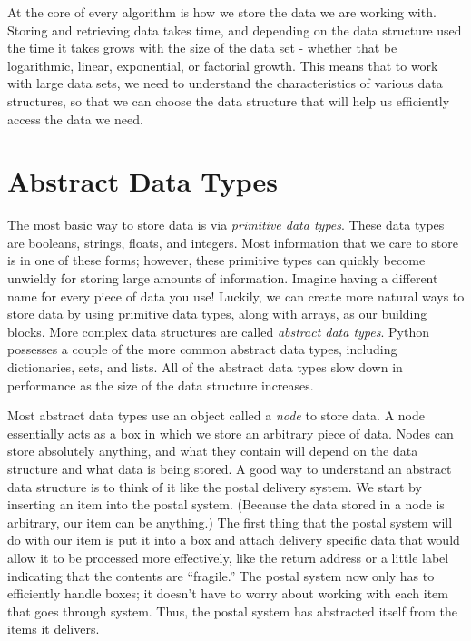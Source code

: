 \label{lab:Python_DataStructures}

At the core of every algorithm is how we store the data we are working with.
Storing and retrieving data takes time, and depending on the data structure used the time it takes grows with the size of the data set - whether that be logarithmic, linear, exponential, or factorial growth.
This means that to work with large data sets, we need to understand the characteristics of various data structures, so that we can choose the data structure that will help us efficiently access the data we need.

\section*{Abstract Data Types}

The most basic way to store data is via \emph{primitive data types}.
These data types are booleans, strings, floats, and integers.
Most information that we care to store is in one of these forms;
however, these primitive types can quickly become unwieldy for storing large amounts of information.
Imagine having a different name for every piece of data you use!
Luckily, we can create more natural ways to store data by using primitive data types, along with arrays, as our building blocks.
More complex data structures are called \emph{abstract data types}.
Python possesses a couple of the more common abstract data types, including dictionaries, sets, and lists.
All of the abstract data types slow down in performance as the size of the data structure increases. %

Most abstract data types use an object called a \emph{node} to store data.
A node essentially acts as a box in which we store an arbitrary piece of data.
Nodes can store absolutely anything, and what they contain will depend on the data structure and what data is being stored.
A good way to understand an abstract data structure is to think of it like the postal delivery system.
We start by inserting an item into the postal system.  (Because the data stored in a node is arbitrary, our item can be anything.)
The first thing that the postal system will do with our item is put it into a box and attach delivery specific data that would allow it to be processed more effectively,
like the return address or a little label indicating that the contents are ``fragile.''
The postal system now only has to efficiently handle boxes;
it doesn't have to worry about working with each item that goes through system.
Thus, the postal system has abstracted itself from the items it delivers.

